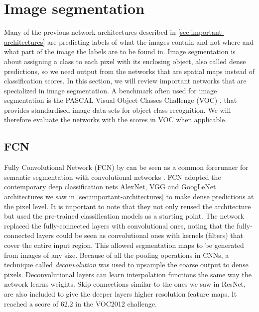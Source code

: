 \section{Image segmentation}
Many of the previous network architectures described in \autoref{sec:important-architectures} are predicting labels of what the images contain and not where and what part of the image the labels are to be found in. Image segmentation is about assigning a class to each pixel with its enclosing object, also called dense predictions, so we need output from the networks that are spatial maps instead of classification scores. In this section, we will review important networks that are specialized in image segmentation. A benchmark often used for image segmentation is the PASCAL Visual Object Classes Challenge (VOC) \cite{Everingham2010}, that provides standardised image data sets for object class recognition. We will therefore evaluate the networks with the scores in VOC when applicable.


\subsection{FCN}
Fully Convolutional Network (FCN) by \citeauthor{Long2014} \cite{Long2014} can be seen as a common forerunner for semantic segmentation with convolutional networks \cite{Garcia-Garcia2017}. FCN adopted the contemporary deep classification nets AlexNet, VGG and GoogLeNet architectures we saw in \autoref{sec:important-architectures} to make dense predictions at the pixel level. It is important to note that they not only reused the architecture but used the pre-trained classification models as a starting point. The network replaced the fully-connected layers with convolutional ones, noting that the fully-connected layers could be seen as convolutional ones with kernels (filters) that cover the entire input region. This allowed segmentation maps to be generated from images of any size. Because of all the pooling operations in CNNs, a technique called \emph{deconvolution} \cite{Zeiler2011} was used to upsample the coarse output to dense pixels. Deconvolutional layers can learn interpolation functions the same way the network learns weights. Skip connections similar to the ones we saw in ResNet, are also included to give the deeper layers higher resolution feature maps. It reached a score of 62.2 in the VOC2012 challenge. 


